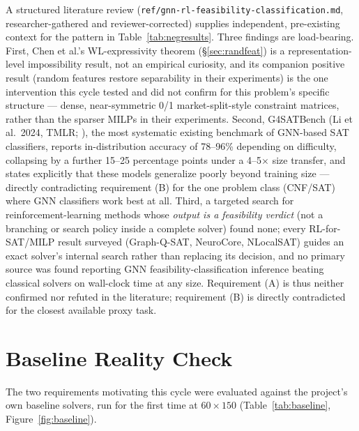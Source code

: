 \documentclass[12pt]{article}
\begin{document}
A structured literature review (\texttt{ref/gnn-rl-feasibility-classification.md}, researcher-gathered and reviewer-corrected) supplies independent, pre-existing context for the pattern in Table~\ref{tab:negresults}. Three findings are load-bearing. First, Chen et al.'s WL-expressivity theorem (\S\ref{sec:randfeat}) is a representation-level impossibility result, not an empirical curiosity, and its companion positive result (random features restore separability in their experiments) is the one intervention this cycle tested and did not confirm for this problem's specific structure --- dense, near-symmetric 0/1 market-split-style constraint matrices, rather than the sparser MILPs in their experiments. Second, G4SATBench (Li et al.\ 2024, TMLR; \citealp{li2024g4satbench}), the most systematic existing benchmark of GNN-based SAT classifiers, reports in-distribution accuracy of 78--96\% depending on difficulty, collapsing by a further 15--25 percentage points under a 4--5$\times$ size transfer, and states explicitly that these models generalize poorly beyond training size --- directly contradicting requirement (B) for the one problem class (CNF/SAT) where GNN classifiers work best at all. Third, a targeted search for reinforcement-learning methods whose \emph{output is a feasibility verdict} (not a branching or search policy inside a complete solver) found none; every RL-for-SAT/MILP result surveyed (Graph-Q-SAT, NeuroCore, NLocalSAT) guides an exact solver's internal search rather than replacing its decision, and no primary source was found reporting GNN feasibility-classification inference beating classical solvers on wall-clock time at any size. Requirement (A) is thus neither confirmed nor refuted in the literature; requirement (B) is directly contradicted for the closest available proxy task.

\section{Baseline Reality Check}
\label{sec:baseline}

The two requirements motivating this cycle were evaluated against the project's own baseline solvers, run for the first time at $60\times150$ (Table~\ref{tab:baseline}, Figure~\ref{fig:baseline}).
\end{document}
